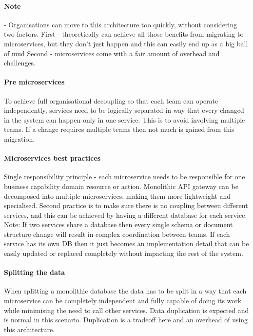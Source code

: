 \documentclass[a4paper, 11pt]{book}
\begin{document}
    \paragraph{Note} - Organisations can move to this architecture too quickly, without considering two factors.
    First - theoretically can achieve all those benefits from migrating to microservices, but they don't just happen and this can easily end up as a big ball of mud
    Second - microservices come with a fair amount of overhead and challenges.

    \paragraph{Pre microservices}
    To achieve full organisational decoupling so that each team can operate independently, services need to be logically separated in way that every changed in the system can happen only in one service.
    This is to avoid involving multiple teams.
    If a change requires multiple teams then not much is gained from this migration.

    \paragraph{Microservices best practices}
    Single responsibility principle - each microservice needs to be responsible for one business capability domain resource or action.
    Monolithic API gateway can be decomposed into multiple microservices, making them more lightweight and specialised.
    Second practice is to make sure there is no coupling between different services, and this can be achieved by having a different database for each service.
    Note: If two services share a database then every single schema or document structure change will result in complex coordination between teams.
    If each service has its own DB then it just becomes an implementation detail that can be easily updated or replaced completely without impacting the rest of the system.

    \paragraph{Splitting the data}
    When splitting a monolithic database the data has to be split in a way that each microservice can be completely independent and fully capable of doing its work while minimising the need to call other services.
    Data duplication is expected and is normal in this scenario.
    Duplication is a tradeoff here and an overhead of using this architecture.
\end{document}

